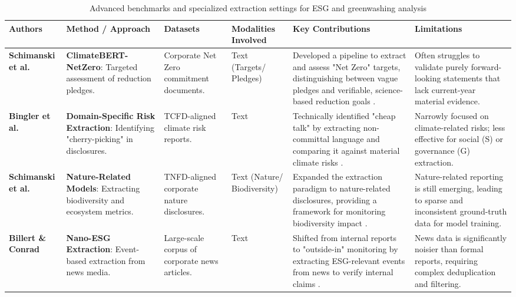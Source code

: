 \documentclass[english, online, cse, master]{dithesis}
\begin{document}
\begin{landscape}
\begin{table}[p]
\centering
\caption{Advanced benchmarks and specialized extraction settings for ESG and greenwashing analysis}
\label{tab:advanced-esg-greenwashing-benchmarks}
\small
\renewcommand{\arraystretch}{1.2}
\begin{tabularx}{\linewidth}{|p{1.8cm}|p{3.5cm}|p{2.5cm}|p{1.8cm}|X|X|}
\hline
Authors & Method / Approach & Datasets & Modalities Involved & Key Contributions & Limitations \\ \hline
\textbf{Schimanski et al.}  \parencite{tobias_schimanski_241ada20} & \textbf{ClimateBERT-NetZero}: Targeted assessment of reduction pledges. & Corporate Net Zero commitment documents. & Text (Targets/ Pledges) & Developed a pipeline to extract and assess "Net Zero" targets, distinguishing between vague pledges and verifiable, science-based reduction goals  \parencite{tobias_schimanski_241ada20}. & Often struggles to validate purely forward-looking statements that lack current-year material evidence. \\ \hline
\textbf{Bingler et al.}  \parencite{julia_bingler_268445e3} & \textbf{Domain-Specific Risk Extraction}: Identifying "cherry-picking" in disclosures. & TCFD-aligned climate risk reports. & Text & Technically identified "cheap talk" by extracting non-committal language and comparing it against material climate risks  \parencite{julia_bingler_268445e3}. & Narrowly focused on climate-related risks; less effective for social (S) or governance (G) extraction. \\ \hline
\textbf{Schimanski et al.}  \parencite{tobias_schimanski_3549ff9f} & \textbf{Nature-Related Models}: Extracting biodiversity and ecosystem metrics. & TNFD-aligned corporate nature disclosures. & Text (Nature/ Biodiversity) & Expanded the extraction paradigm to nature-related disclosures, providing a framework for monitoring biodiversity impact  \parencite{tobias_schimanski_3549ff9f}. & Nature-related reporting is still emerging, leading to sparse and inconsistent ground-truth data for model training. \\ \hline
\textbf{Billert \& Conrad}  \parencite{fabian_billert_a5fbb687} & \textbf{Nano-ESG Extraction}: Event-based extraction from news media. & Large-scale corpus of corporate news articles. & Text & Shifted from internal reports to "outside-in" monitoring by extracting ESG-relevant events from news to verify internal claims  \parencite{fabian_billert_a5fbb687}. & News data is significantly noisier than formal reports, requiring complex deduplication and filtering. \\ \hline

\end{tabularx}
\end{table}
\end{landscape}
\end{document}

